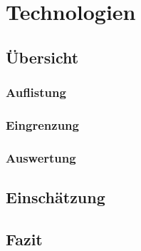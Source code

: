 \section{Technologien}
\subsection{Übersicht}
\subsubsection{Auflistung}%
\subsubsection{Eingrenzung}%
\subsubsection{Auswertung}%
\subsection{Einschätzung}%
\subsection{Fazit}